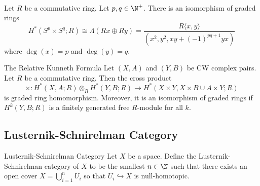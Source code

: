 \documentclass[a4paper]{article}
\begin{document}
\begin{eg}{}{}\\
Let $R$ be a commutative ring. Let $p,q\in\N^+$. There is an isomorphism of graded rings $$H^\ast(S^p\times S^q;R)\cong\Lambda(Rx\oplus Ry)=\frac{R\langle x,y\rangle}{(x^2,y^2,xy+(-1)^{pq+1}yx)}$$ where $\deg(x)=p$ and $\deg(y)=q$. 
\end{eg}

\begin{thm}{The Relative Kunneth Formula}{} Let $(X,A)$ and $(Y,B)$ be CW complex pairs. Let $R$ be a commutative ring. Then the cross product $$\times:H^\ast(X,A;R)\otimes_R H^\ast(Y,B;R)\to H^\ast(X\times Y,X\times B\cup A\times Y;R)$$ is graded ring homomorphism. Moreover, it is an isomorphism of graded rings if $H^k(Y,B;R)$ is a finitely generated free $R$-module for all $k$. 
\end{thm}

\subsection{Lusternik-Schnirelman Category}
\begin{defn}{Lusternik-Schnirelman Category}{} Let $X$ be a space. Define the Lusternik-Schnirelman category of $X$ to be the smallest $n\in\N$ such that there exists an open cover $X=\bigcup_{i=1}^nU_i$ so that $U_i\hookrightarrow X$ is null-homotopic. 
\end{defn}
\end{document}
